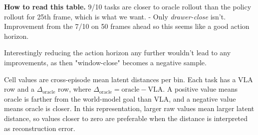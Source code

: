\documentclass{article}
\begin{document}
\par\vspace{0.3em}
\noindent\small\textbf{How to read this table.} 9/10 tasks are closer to oracle rollout than the policy rollout for 25th frame, which is what we want. 
- Only \textit{drawer-close} isn't.
Improvement from the 7/10 on 50 frames ahead so this seems like a good action horizon.

Interestingly reducing the action horizon any further wouldn't lead to any improvements, as then "window-close" becomes a negative sample.

Cell values are cross-episode mean latent distances per bin. Each task has a VLA row and a \(\Delta_{\mathrm{oracle}}\) row, where \(\Delta_{\mathrm{oracle}} = \mathrm{oracle} - \mathrm{VLA}\). A positive value means oracle is farther from the world-model goal than VLA, and a negative value means oracle is closer. In this representation, larger raw values mean larger latent distance, so values closer to zero are preferable when the distance is interpreted as reconstruction error.










\end{document}
